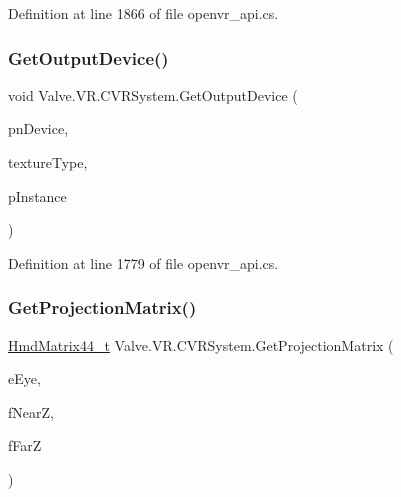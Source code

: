 Definition at line 1866 of file openvr\+\_\+api.\+cs.

\mbox{\label{class_valve_1_1_v_r_1_1_c_v_r_system_a385592a6afe1b4695151161044f49e99}} 
\subsubsection{\texorpdfstring{GetOutputDevice()}{GetOutputDevice()}}
{\footnotesize\ttfamily void Valve.\+V\+R.\+C\+V\+R\+System.\+Get\+Output\+Device (\begin{DoxyParamCaption}\item[{ref ulong}]{pn\+Device,  }\item[{\mbox{\hyperlink{namespace_valve_1_1_v_r_a9481de640e411eef49c2f3fdca82eaa3}{E\+Texture\+Type}}}]{texture\+Type,  }\item[{Int\+Ptr}]{p\+Instance }\end{DoxyParamCaption})}



Definition at line 1779 of file openvr\+\_\+api.\+cs.

\mbox{\label{class_valve_1_1_v_r_1_1_c_v_r_system_a8e06a8dc62a3d7d82a8672a024d4a3d3}} 
\subsubsection{\texorpdfstring{GetProjectionMatrix()}{GetProjectionMatrix()}}
{\footnotesize\ttfamily \mbox{\hyperlink{struct_valve_1_1_v_r_1_1_hmd_matrix44__t}{Hmd\+Matrix44\+\_\+t}} Valve.\+V\+R.\+C\+V\+R\+System.\+Get\+Projection\+Matrix (\begin{DoxyParamCaption}\item[{\mbox{\hyperlink{namespace_valve_1_1_v_r_a8153d4a3e627e1cede046327087c1880}{E\+V\+R\+Eye}}}]{e\+Eye,  }\item[{float}]{f\+NearZ,  }\item[{float}]{f\+FarZ }\end{DoxyParamCaption})}




